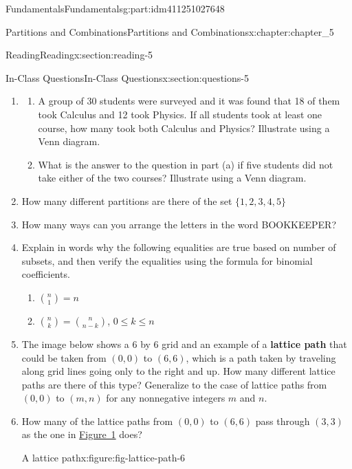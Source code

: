 \documentclass[oneside,10pt,]{book}
\newcommand{\terminology}[1]{\textbf{#1}}
\numberwithin{equation}{section}
\begin{document}
\begin{partptx}{Fundamentals}{}{Fundamentals}{}{}{g:part:idm411251027648}
\begin{chapterptx}{Partitions and Combinations}{}{Partitions and Combinations}{}{}{x:chapter:chapter_5}
\begin{sectionptx}{Reading}{}{Reading}{}{}{x:section:reading-5}
\begin{itemize}[label=\textbullet]
\end{itemize}
%
\end{sectionptx}
%
%
\typeout{************************************************}
\typeout{************************************************}
%
\begin{sectionptx}{In-Class Questions}{}{In-Class Questions}{}{}{x:section:questions-5}
%
\begin{enumerate}[label=\arabic*.]
\item{}%
\begin{enumerate}[label=(\alph*)]
\item{}A group of 30 students were surveyed and it was found that 18 of them took Calculus and 12 took Physics. If all students took at least one course, how many took both Calculus and Physics? Illustrate using a Venn diagram.%
\item{}What is the answer to the question in part (a) if five students did not take either of the two courses? Illustrate using a Venn diagram.%
\end{enumerate}
%
\item{}How many different partitions are there of the set \(\{1,2,3,4,5\}\)%
\item{}How many ways can you arrange the letters in the word BOOKKEEPER?%
\item{}Explain in words why the following equalities are true based on number of subsets,  and then verify the equalities using the formula for binomial coefficients.%
\par
%
\begin{enumerate}[label=(\alph*)]
\item{}\(\binom{n}{1} = n\)%
\item{}\(\binom{n}{k} = \binom{n}{n-k}\), \(0 \leq k \leq n\)%
\end{enumerate}
%
\item{}The image below shows a 6 by 6 grid and an example of a \terminology{lattice path} that could be taken from \((0,0)\)  to \((6,6)\), which is a path taken by traveling along grid lines going only to the right and up. How many different lattice paths are there of this type?  Generalize to the case of lattice paths from \((0,0)\) to \((m,n)\)  for any nonnegative integers \(m\) and \(n\).%
\item{}How many of the lattice paths from \((0,0)\) to \((6,6)\) pass through \((3,3)\) as the one in \hyperref[x:figure:fig-lattice-path-6]{Figure~1} does?%
\begin{figureptx}{A lattice path}{x:figure:fig-lattice-path-6}{}%

\end{figureptx}
\end{enumerate}
\end{sectionptx}
\end{chapterptx}
\end{partptx}
\end{document}
